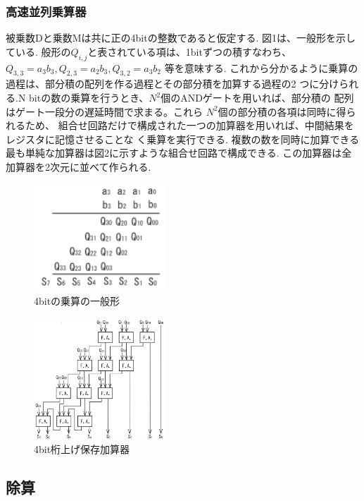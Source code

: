 \documentclass[titlepage]{jsarticle}
\theoremstyle{definition}
\begin{document}
\subsubsection{高速並列乗算器}
被乗数Dと乗数Mは共に正の4bitの整数であると仮定する.
図1は、一般形を示している.
般形の$Q_{i,j}$と表されている項は、1bitずつの積すなわち、
$Q_{3,3} = a_3 b_3, Q_{2,3} = a_2 b_3, Q_{3,2} = a_3 b_2$ 等を意味する.
これから分かるように乗算の過程は、部分積の配列を作る過程とその部分積を加算する過程の2
つに分けられる.N bitの数の乗算を行うとき、$N^2$個のANDゲートを用いれば、部分積の
配列はゲート一段分の遅延時間で求まる。これら $N^2$個の部分積の各項は同時に得られるため、
組合せ回路だけで構成された一つの加算器を用いれば、中間結果をレジスタに記憶させることな
く乗算を実行できる.
複数の数を同時に加算できる最も単純な加算器は図2に示すような組合せ回路で構成できる.
この加算器は全加算器を2次元に並べて作られる.

\begin{figure}[htbp]
	\begin{center}
		\includegraphics[width=50mm]{mult.png}
		\caption{4bitの乗算の一般形}
	\end{center}
\end{figure}


\begin{figure}[htbp]
	\begin{center}
		\includegraphics[width=50mm]{mult_full.png}
		\caption{4bit桁上げ保存加算器}
	\end{center}
\end{figure}



\subsection{除算}
\end{document}
